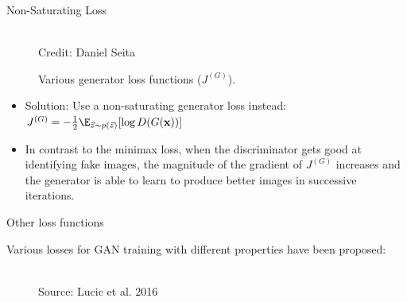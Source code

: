 \begin{frame} {Non-Saturating Loss}
  \begin{figure}
    \centering
      \tiny{\\Credit: Daniel Seita}
      \caption{\footnotesize Various generator loss functions ($J^{(G)}$).}
  \end{figure}
  \begin{itemize}
    \item Solution: Use a non-saturating generator loss instead:  $J^{(G)} = - \frac{1}{2} \E_{\vec z \sim p(\vec z)} [\log D(G(\mathbf{x}))]$
    \item In contrast to the minimax loss, when the discriminator gets good at identifying fake images, the magnitude of the gradient of $J^{(G)}$ increases and the generator is able to learn to produce better images in successive iterations.
  \end{itemize}
\end{frame}


\begin{frame} {Other loss functions}

Various losses for GAN training with different properties have been proposed:

  \vspace{10mm}
  \begin{figure}
    \centering
      \tiny{\\Source: Lucic et al. 2016}
  \end{figure}
\end{frame}


